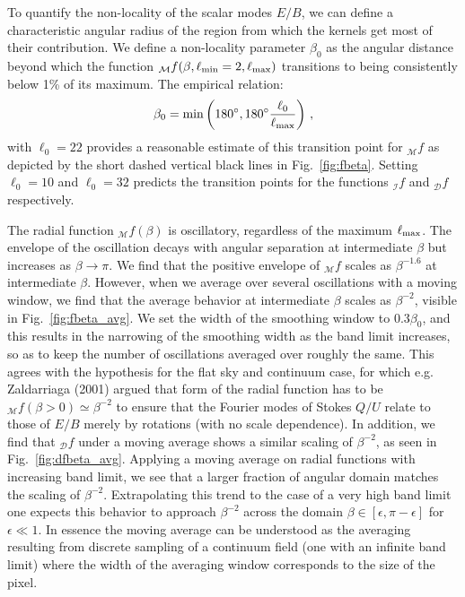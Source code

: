 \documentclass[a4paper,11pt]{article}
\newcommand{\beq}{\begin{equation}}
\newcommand{\eeq}{\end{equation}}
\newcommand{\mm}{\mathcal{M}}
\newcommand{\md}{\mathcal{D}}
\newcommand{\mi}{\mathcal{I}}
\def\fig#1{{Fig.~\ref{#1}}}
\begin{document}
To quantify the non-locality of the scalar modes $E/B$, we can define a characteristic angular radius of the region from which the kernels get most of their contribution.   We define a non-locality parameter $\beta_{0}$ as the angular distance beyond which the function ${_{\mm}f}(\beta,\ell_{\rm min}=2,\ell_{\rm max})$ transitions to being consistently below 1\% of its maximum.
The empirical relation:
\beq
\beta_0= {\rm min}\left(180^\circ,180^\circ \frac{\ell_{0}}{\ell_{\rm max}} \right) \,,
\eeq
with $\ell_{0}=22$ provides a reasonable estimate of this transition point for ${}_{\mm}f$ as depicted by the short dashed vertical black lines in \fig{fig:fbeta}. Setting $\ell_{0}=10$ and $\ell_{0}=32$ predicts the transition points for the functions ${}_{\mi}f$ and  ${}_{\md}f$ respectively.

The radial function ${}_\mm f(\beta)$ is oscillatory, regardless of the maximum $\ell_{\rm max}$. The envelope of the oscillation decays with angular separation at intermediate $\beta$ but increases as $\beta \rightarrow \pi$.  We find that the positive envelope of ${}_{\mm}f$ scales as $\beta^{-1.6}$ at intermediate $\beta$.  However, when we average over several oscillations with a moving window, we find that the average behavior at intermediate $\beta$ scales as $\beta^{-2}$, visible in \fig{fig:fbeta_avg}. We set the width of the smoothing window to $0.3\beta_0$, and this results in the narrowing of the smoothing width as the band limit increases, so as to keep the number of oscillations averaged over roughly the same.  This agrees with the hypothesis for the {flat sky and continuum case}, for which e.g. Zaldarriaga (2001) \cite{Zaldarriaga2001a} argued that form of the radial function has to be ${}_\mm f(\beta>0)\simeq\beta^{-2}$ to ensure that the Fourier modes of Stokes $Q/U$ relate to those of $E/B$ merely by rotations (with no scale dependence). In addition, we find that ${}_{\md}f$ under a moving average shows a similar scaling of $\beta^{-2}$, as seen in \fig{fig:dfbeta_avg}.
Applying a moving average on radial functions with increasing band limit, we see that a larger fraction of angular domain matches the scaling of $\beta^{-2}$.   Extrapolating this trend to the case of a very high band limit one expects this behavior to approach $\beta^{-2}$ across the domain $\beta\in[\epsilon,\pi-\epsilon]$ for $\epsilon \ll 1$. In essence the moving average can be understood as the averaging resulting from discrete sampling of a continuum field (one with an infinite band limit) where the width of the averaging window corresponds to the size of the pixel.
\end{document}
